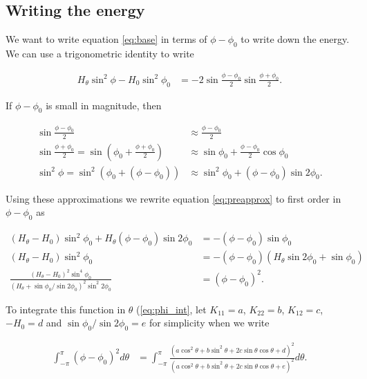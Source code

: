 \subsection{Writing the energy}

We want to write equation \ref{eq:base} in terms of $\phi-\phi_0$ to write down the energy. We can use a trigonometric identity to write

\begin{align}
    H_\theta \sin^2\phi - H_0 \sin^2\phi_0 &= -2 \sin \frac{\phi - \phi_0}{2} \sin\frac{\phi + \phi_0}{2}. \label{eq:preapprox}
\end{align}

\noindent If $\phi - \phi_0$ is small in magnitude, then 

\begin{align*}
    \sin\frac{\phi - \phi_0}{2} &\approx \frac{\phi - \phi_0}{2} \\
    \sin\frac{\phi + \phi_0}{2} = \sin\left(\phi_0 + \frac{\phi + \phi_0}{2} \right) &\approx \sin\phi_0 + \frac{\phi - \phi_0}{2} \cos\phi_0 \\
    \sin^2\phi = \sin^2\left(\phi_0 + (\phi - \phi_0) \right) &\approx \sin^2\phi_0 +(\phi - \phi_0)\sin2\phi_0.
\end{align*}

Using these approximations we rewrite equation \ref{eq:preapprox} to first order in $\phi - \phi_0$ as

\begin{align*}
    (H_\theta - H_0) \sin^2\phi_0 + H_\theta (\phi - \phi_0)\sin2\phi_0 &= -(\phi - \phi_0) \sin\phi_0 \\
    (H_\theta - H_0) \sin^2\phi_0 &= -(\phi-\phi_0) (H_\theta \sin2\phi_0 + \sin\phi_0) \\
    \frac{(H_\theta-H_0)^2 \sin^4\phi_0}{(H_\theta + \sin\phi_0 / \sin2\phi_0)^2 \sin^2 2\phi_0} &= (\phi - \phi_0)^2.
\end{align*}

To integrate this function in $\theta$ (\cref{eq:phi_int}, let $K_{11} = a$, $K_{22} = b$, $K_{12} = c$, $-H_0 = d$ and $\sin\phi_0/ \sin 2 \phi_0 = e$ for simplicity when we write

\begin{align}
    \int_{-\pi}^\pi (\phi - \phi_0)^2 d\theta &= \int_{-\pi}^\pi \frac{\left(a\cos^2\theta + b\sin^2\theta + 2c\sin\theta\cos\theta + d \right)^2}{\left(a\cos^2\theta + b\sin^2\theta + 2c\sin\theta\cos\theta + e \right)^2} d\theta. \label{eq:integral}
\end{align}

